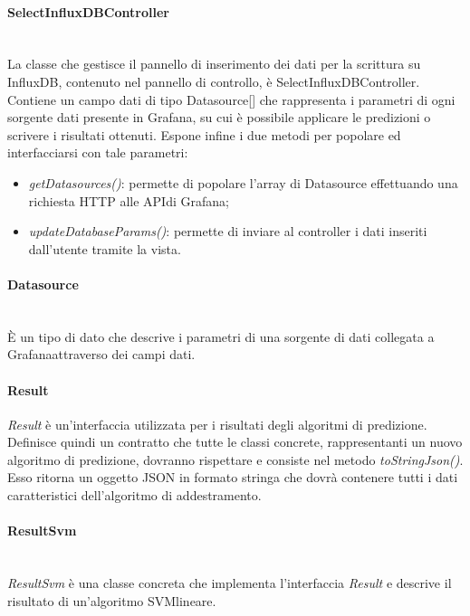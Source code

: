 \paragraph*{SelectInfluxDBController} \mbox{}\\ [1mm]
La classe che gestisce il pannello di inserimento dei dati per la scrittura su InfluxDB, contenuto nel pannello di controllo, è SelectInfluxDBController.
Contiene un campo dati di tipo Datasource[] che rappresenta i parametri di ogni sorgente dati presente in Grafana\glo, su cui è possibile applicare le predizioni o scrivere i risultati ottenuti. Espone infine i due metodi per popolare ed interfacciarsi con tale parametri:
\begin{itemize}
	\item \textit{getDatasources()}: permette di popolare l'array di Datasource effettuando una richiesta HTTP alle API\glosp di Grafana\glo;
	\item \textit{updateDatabaseParams()}: permette di inviare al controller i dati inseriti dall'utente tramite la vista.
\end{itemize}
\paragraph*{Datasource} \mbox{}\\ [1mm]
È un tipo di dato che descrive i parametri di una sorgente di dati collegata a Grafana\glosp attraverso dei campi dati.
\paragraph*{Result}
\textit{Result} è un'interfaccia utilizzata per i risultati degli algoritmi di predizione. Definisce quindi un contratto che tutte le classi concrete, rappresentanti un nuovo algoritmo di predizione, dovranno rispettare e consiste nel metodo \textit{toStringJson()}. Esso ritorna un oggetto JSON in formato stringa che dovrà contenere tutti i dati caratteristici dell'algoritmo di addestramento.
\paragraph*{ResultSvm} \mbox{}\\ [1mm]
\textit{ResultSvm} è una classe concreta che implementa l'interfaccia \textit{Result} e descrive il risultato di un'algoritmo SVM\glosp lineare.
